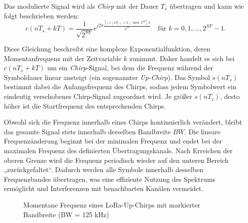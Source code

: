 	\medskip
	Das modulierte Signal wird als \emph{Chirp} mit der Dauer \( T_s \) übertragen und kann wie folgt beschrieben werden:
	\[
	c(nT_s + kT) = 
	\frac{1}{\sqrt{2^{SF}}}
	e^{j 2\pi 
		\frac{[(s(nT_s) + k)\bmod 2^{SF}]\, k}{2^{SF}}}
	\quad \text{für } k = 0, 1, \dots, 2^{SF}-1.
	\]
	
	\medskip
	Diese Gleichung beschreibt eine komplexe Exponentialfunktion, deren Momentanfrequenz mit der Zeitvariable \( k \) zunimmt. Daher handelt es sich bei \( c(nT_s + kT) \) um ein \emph{Chirp}-Signal, bei dem die Frequenz während der Symboldauer linear ansteigt (ein sogenannter \emph{Up-Chirp}). Das Symbol \( s(nT_s) \) bestimmt dabei die Anfangsfrequenz des Chirps, sodass jedem Symbolwert ein eindeutig verschobenes Chirp-Signal zugeordnet wird. Je grö{\ss}er \( s(nT_s) \), desto höher ist die Startfrequenz des entsprechenden Chirps.
	
	Obwohl sich die Frequenz innerhalb eines Chirps kontinuierlich verändert, bleibt das gesamte Signal stets innerhalb derselben Bandbreite \( BW \). Die lineare Frequenzänderung beginnt bei der minimalen Frequenz und endet bei der maximalen Frequenz des definierten Übertragungskanals. Nach Erreichen der oberen Grenze wird die Frequenz periodisch wieder auf den unteren Bereich „zurückgefaltet“. Dadurch werden alle Symbole innerhalb desselben Frequenzbandes übertragen, was eine effiziente Nutzung des Spektrums ermöglicht und Interferenzen mit benachbarten Kanälen vermeidet.

	
	\begin{figure}[H]
		\centering
		\caption{Momentane Frequenz eines LoRa-Up-Chirps mit markierter Bandbreite (BW = 125 kHz)}
	\end{figure}

